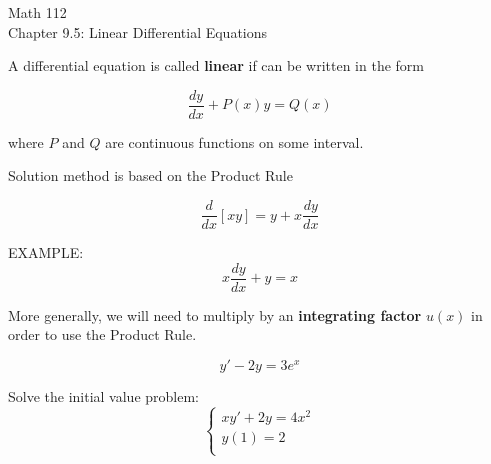 \documentclass[11pt]{article}
\begin{document}
\begin{center}
\Large
\rm{Math 112}
\\
\rm{Chapter 9.5:  Linear Differential Equations}\\

\end{center}
\vspace{0.2in}

\vspace{0.2in}

A differential equation is called {\bf linear} if can be written in the form

\begin{displaymath}
  \frac{dy}{dx} + P(x)y = Q(x)
\end{displaymath}

\vspace{0.2in}
where $P$ and $Q$ are continuous functions on some interval.  

\vspace{.5in}

Solution method is based on the Product Rule

\begin{displaymath}
  \frac{d}{dx}[xy] = y + x \frac{dy}{dx}
\end{displaymath}

\vspace{0.2in}
  
  EXAMPLE:\\

\begin{displaymath}
x \frac{dy}{dx} + y = x
\end{displaymath}
  
\vspace{1.5in}


More generally, we will need to multiply by an {\bf integrating factor} $u(x)$ in order to use the Product Rule.

\begin{displaymath}
y' -2y = 3e^x
\end{displaymath}

\pagebreak

Solve the initial value problem:\\

\begin{displaymath}
  \left\{ \begin{array}{ll}
  xy'+2y = 4x^2 \\
y(1) = 2 \\
\end{array} \right.
\end{displaymath}
\end{document}
